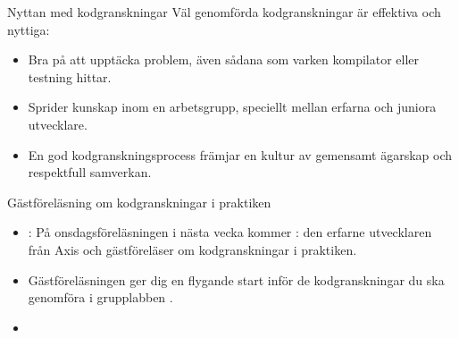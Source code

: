 \begin{Slide}{Nyttan med kodgranskningar}
Väl genomförda kodgranskningar är effektiva och nyttiga:
\begin{itemize}
\item Bra på att upptäcka problem, även sådana som varken kompilator eller testning hittar.
\item Sprider kunskap inom en arbetsgrupp, speciellt mellan erfarna och juniora utvecklare.
\item En god kodgranskningsprocess främjar en kultur av gemensamt ägarskap och respektfull samverkan.
\end{itemize}
\end{Slide}




\ifkompendium\else
\begin{Slide}{Gästföreläsning om kodgranskningar i praktiken}
\begin{itemize}
\item {}: På onsdagsföreläsningen i nästa vecka kommer : den erfarne utvecklaren  från Axis och gästföreläser om kodgranskningar i praktiken. 
\item Gästföreläsningen ger dig en flygande start inför de kodgranskningar du ska genomföra i grupplabben .
\item {}
\end{itemize}
\end{Slide}
\fi
